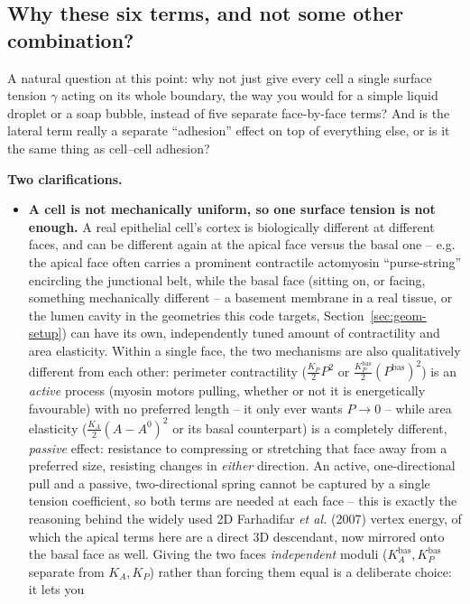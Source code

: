 \documentclass[11pt,a4paper]{report}
\begin{document}
\subsection*{Why these six terms, and not some other combination?}
A natural question at this point: why not just give every cell a
single surface tension $\gamma$ acting on its whole boundary, the way
you would for a simple liquid droplet or a soap bubble, instead of
five separate face-by-face terms? And is the lateral term really a
separate ``adhesion'' effect on top of everything else, or is it the
same thing as cell--cell adhesion?
\begin{physbox}
\textbf{Two clarifications.}
\begin{itemize}[leftmargin=1.4em]
  \item \textbf{A cell is not mechanically uniform, so one surface
  tension is not enough.} A real epithelial cell's cortex is
  biologically different at different faces, and can be different
  again at the apical face versus the basal one -- e.g. the apical
  face often carries a prominent contractile actomyosin
  ``purse-string'' encircling the junctional belt, while the basal
  face (sitting on, or facing, something mechanically different --
  a basement membrane in a real tissue, or the lumen cavity in the
  geometries this code targets, Section~\ref{sec:geom-setup}) can have
  its own, independently tuned amount of contractility and area
  elasticity. Within a single face, the two mechanisms are also
  qualitatively different from each other: perimeter contractility
  ($\tfrac{K_P}{2}P^2$ or $\tfrac{K_P^{\mathrm{bas}}}{2}(P^{\mathrm{bas}})^2$)
  is an \emph{active} process (myosin motors pulling, whether or not
  it is energetically favourable) with no preferred length -- it only
  ever wants $P\to 0$ -- while area elasticity
  ($\tfrac{K_A}{2}(A-A^0)^2$ or its basal counterpart) is a completely
  different, \emph{passive} effect: resistance to compressing or
  stretching that face away from a preferred size, resisting changes
  in \emph{either} direction. An active, one-directional pull and a
  passive, two-directional spring cannot be captured by a single
  tension coefficient, so both terms are needed at each face -- this
  is exactly the reasoning behind the widely used 2D Farhadifar
  \emph{et al.} (2007) vertex energy, of which the apical terms here
  are a direct 3D descendant, now mirrored onto the basal face as
  well. Giving the two faces \emph{independent} moduli
  ($K_A^{\mathrm{bas}}, K_P^{\mathrm{bas}}$ separate from $K_A, K_P$)
  rather than forcing them equal is a deliberate choice: it lets you

\end{itemize}
\end{physbox}
\end{document}
